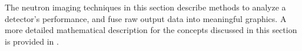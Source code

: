 \documentclass[../../../main.tex]{subfiles}
\begin{document}
%
    \Xsubsection%
    The neutron imaging techniques in this section describe methods to analyze a detector's performance, and fuse raw output data into meaningful graphics.
    A more detailed mathematical description for the concepts discussed in this section is provided in .
\end{document}
